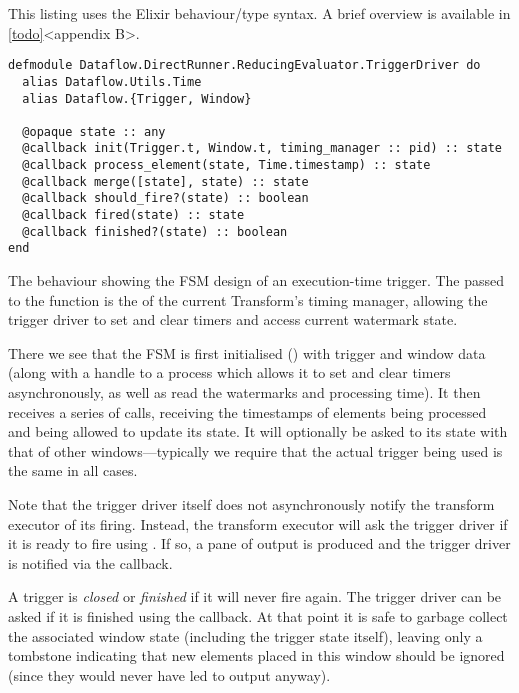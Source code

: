 \footnotetext
{
This listing uses the Elixir behaviour/type syntax. A brief overview is available in \cref{todo}<appendix B>.
}

\begin{listing}[h]
	\begin{verbatim}
defmodule Dataflow.DirectRunner.ReducingEvaluator.TriggerDriver do
  alias Dataflow.Utils.Time
  alias Dataflow.{Trigger, Window}
  
  @opaque state :: any
  @callback init(Trigger.t, Window.t, timing_manager :: pid) :: state
  @callback process_element(state, Time.timestamp) :: state
  @callback merge([state], state) :: state
  @callback should_fire?(state) :: boolean
  @callback fired(state) :: state
  @callback finished?(state) :: boolean
end
	\end{verbatim}
\caption[The  behaviour showing the FSM design of an execution-time trigger.]{The  behaviour showing the FSM design of an execution-time trigger. The  passed to the  function is the  of the current Transform's timing manager, allowing the trigger driver to set and clear timers and access current watermark state.}
\label{lst:impl:trigger_driver}
\end{listing}


There we see that the FSM is first initialised () with trigger and window data (along with a handle to a process which allows it to set and clear timers asynchronously, as well as read the watermarks and processing time).
It then receives a series of  calls, receiving the timestamps of elements being processed and being allowed to update its state.
It will optionally be asked to  its state with that of other windows---typically we require that the actual trigger being used is the same in all cases.

Note that the trigger driver itself does not asynchronously notify the transform executor of its firing.
Instead, the transform executor will ask the trigger driver if it is ready to fire using .
If so, a pane of output is produced and the trigger driver is notified via the  callback.

A trigger is \emph{closed} or \emph{finished} if it will never fire again.
The trigger driver can be asked if it is finished using the  callback.
At that point it is safe to garbage collect the associated window state (including the trigger state itself), leaving only a tombstone indicating that new elements placed in this window should be ignored (since they would never have led to output anyway).

